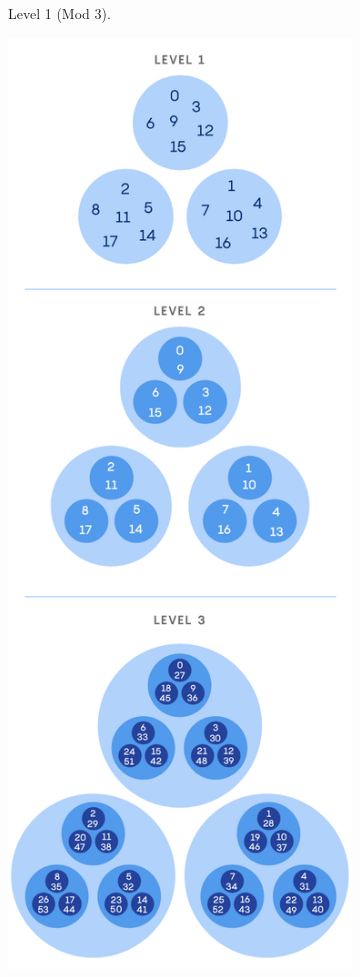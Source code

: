 \documentclass[11pt]{article}
\begin{document}
\begin{figure}[h!]
\begin{subfigure}{0.29\textwidth}
    \caption{Level 1 (Mod 3).}
    \label{fig:first}
  \end{subfigure}
  \hfill
  \begin{subfigure}{0.30\textwidth}
    \centering
    \includegraphics[height=.2\textheight,trim={1cm 17cm 1cm 12cm},clip]{levels.png}

\end{subfigure}
\end{figure}
\end{document}

